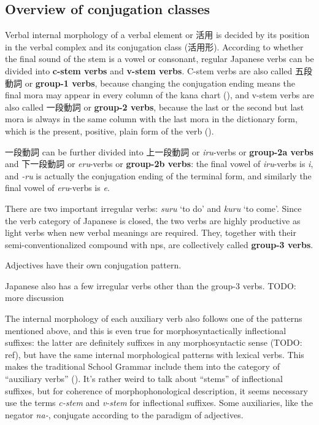 \documentclass[UTF8, a4paper, oneside, scheme=plain]{ctexrep}
\newcommand*{\concept}[1]{\textbf{#1}}
\newcommand*{\term}[1]{\emph{#1}}
\newcommand{\corpus}[1]{\emph{#1}}
\newcommand{\translate}[1]{`#1'}
\begin{document}
\subsection{Overview of conjugation classes}\label{sec:conjugation-class-overview}

Verbal internal morphology of a verbal element or 活用 
is decided by its position in the verbal complex 
and its conjugation class (活用形).
According to whether the final sound of the stem is a vowel or consonant,
regular Japanese verbs can be divided into \concept{c-stem verbs} and \concept{v-stem verbs}.
C-stem verbs are also called 五段動詞 or \concept{group-1 verbs},
because changing the conjugation ending means 
the final mora may appear in every column of the kana chart (), 
and v-stem verbs are also called 一段動詞 or \concept{group-2 verbs},
because the last or the second but last mora is always in the same column 
with the last mora in the dictionary form,
which is the present, positive, plain form of the verb ().

一段動詞 can be further divided into 上一段動詞 or \corpus{iru}-verbs or \concept{group-2a verbs} 
and 下一段動詞 or \corpus{eru}-verbs or \concept{group-2b verbs}:
the final vowel of \corpus{iru}-verbs is \corpus{i},
and \corpus{-ru} is actually the conjugation ending of the terminal form,
and similarly the final vowel of \corpus{eru}-verbs is \corpus{e}.

There are two important irregular verbs: \corpus{suru} \translate{to do} 
and \corpus{kuru} \translate{to come}.
Since the verb category of Japanese is closed,
the two verbs are highly productive as light verbs when new verbal meanings are required.
They, together with their semi-conventionalized compound with \ac{np}s,
are collectively called \concept{group-3 verbs}.

Adjectives have their own conjugation pattern.

Japanese also has a few irregular verbs other than the group-3 verbs. TODO: more discussion

The internal morphology of each auxiliary verb also follows one of the patterns mentioned above,
and this is even true for morphosyntactically inflectional suffixes:
the latter are definitely suffixes in any morphosyntactic sense (TODO: ref),
but have the same internal morphological patterns with lexical verbs.
This makes the traditional School Grammar include them into the category of ``auxiliary verbs''
().
It's rather weird to talk about ``stems'' of inflectional suffixes,
but for coherence of morphophonological description,
it seems necessary use the terms \term{c-stem} and \term{v-stem} for inflectional suffixes.
Some auxiliaries, like the negator \corpus{na-},
conjugate according to the paradigm of adjectives.
\end{document}
